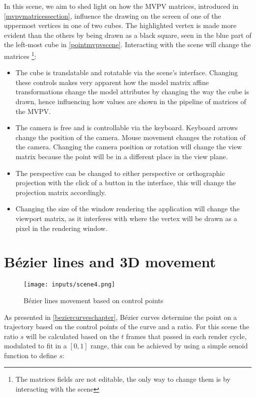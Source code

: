 \documentclass[cic,tc,english]{iiufrgs}
\begin{document}
In this scene, we aim to shed light on how the MVPV matrices, introduced in \cref{mvpvmatricessection}, influence the drawing on the screen of one of the uppermost vertices in one of two cubes. The highlighted vertex is made more evident than the others by being drawn as a black square, seen in the blue part of the left-most cube in \cref{pointmvpvscene}. Interacting with the scene will change the matrices \footnote{The matrices fields are not editable, the only way to change them is by interacting with the scene}:
\begin{itemize}
\item The cube is translatable and rotatable via the scene's interface. Changing these controls makes very apparent how the model matrix affine transformations change the model attributes by changing the way the cube is drawn, hence influencing how values are shown in the pipeline of matrices of the MVPV. 

\item The camera is free and is controllable via the keyboard. Keyboard arrows change the position of the camera. Mouse movement changes the rotation of the camera. Changing the camera position or rotation will change the view matrix because the point will be in a different place in the view plane.

\item The perspective can be changed to either perspective or orthographic projection with the click of a button in the interface, this will change the projection matrix accordingly.

\item Changing the size of the window rendering the application will change the viewport matrix, as it interferes with where the vertex will be drawn as a pixel in the rendering window.
\end{itemize}
%
\section{Bézier lines and 3D movement}
\begin{figure}[hbt!]
    \caption{Bézier lines movement based on control points}
    \begin{center}
        \texttt{[image: inputs/scene4.png]}
    \end{center}
    \label{scene4demo}
\end{figure}

As presented in \cref{beziercurveschapter}, Bézier curves determine the point on a trajectory based on the control points of the curve and a ratio. For this scene the ratio $s$ will be calculated based on the $t$ frames that passed in each render cycle, modulated to fit in a $[0, 1]$ range, this can be achieved by using a simple senoid function to define $s$:
\end{document}
